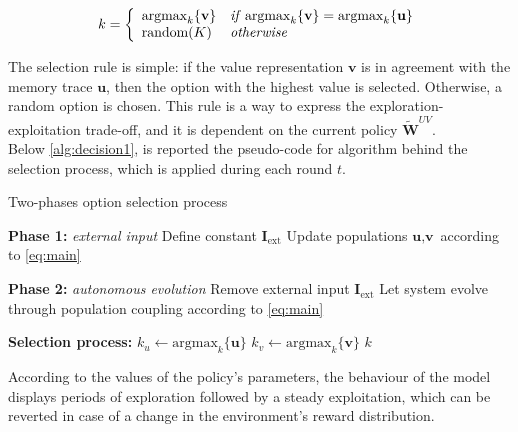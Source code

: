 \begin{equation*}
    k =
    \left\{
        \begin{array}{ll}
            \text{argmax}_{k}\{\textbf{v}\} & \text{\textit{if}}\; \text{argmax}_{k} \{\textbf{v}\} = \text{argmax}_{k} \{\textbf{u}\} \\
            \text{random}(K) & \text{\textit{otherwise}}
        \end{array}
    \right.
\end{equation*}

\noindent The selection rule is simple: if the value representation $\textbf{v}$ is in agreement with the memory trace $\textbf{u}$, then the option with the highest value is selected. Otherwise, a random option is chosen.
This rule is a way to express the exploration-exploitation trade-off, and it is dependent on the current policy $\tilde{\textbf{W}}^{UV}$. \\ Below \ref{alg:decision1}, is reported the pseudo-code for algorithm behind the selection process, which is applied during each round $t$.

\begin{algorithm}[ht]
\caption{Two-phases option selection process}
\label{alg:decision}
\SetAlgoLined
{}


\textbf{Phase 1:} \textit{external input} 
Define constant $\textbf{I}_{\text{ext}}$\;
Update populations $\textbf{u}, \textbf{v}$ according to \ref{eq:main}\;

\textbf{Phase 2:} \textit{autonomous evolution} 
Remove external input $\textbf{I}_{\text{ext}}$\;
Let system evolve through population coupling according to \ref{eq:main}\;

\textbf{Selection process:}\;
$k_{u} \gets \text{argmax}_{k}\{\textbf{u}\}$\;
$k_{v} \gets \text{argmax}_{k}\{\textbf{v}\}$\;
\Return $k$
\end{algorithm}\label{alg:decision1}

\noindent According to the values of the policy's parameters, the behaviour of the model displays periods of exploration followed by a steady exploitation, which can be reverted in case of a change in the environment's reward distribution.

